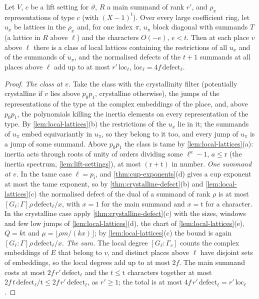 \begin{theorem}\label{thm:local-loss}
Let $V$, $c$ be a lift setting for $\vartheta$, $R$ a main summand of rank $r'$, and $\rho_x$ representations of type $c$ (with $(X-1)^t$). Over every large coefficient ring, let $u_x$ be lattices in the $\rho_x$ and, for one
index $\pi$, $u_\pi$ block diagonal with summands $T$ (a lattice in $R$ above $\ell$) and the characters $O(-e)$, $e<t$. Then at each place $v$ above $\ell$ there is a class of local lattices containing the restrictions of all
$u_x$ and of the summands of $u_\pi$, and the normalised defects of the $t+1$ summands at all places above $\ell$ add up to at most $r'\,\mathrm{loc}_\ell$, $\mathrm{loc}_\ell=4f\,\mathrm{defect}_\ell$.
\end{theorem}

\begin{proof}
\emph{The class at $v$.} Take the class with the crystallinity filter (potentially crystalline if $v$ lies above $p_0p_1$, crystalline otherwise), the jumps of the representations of the type at the complex embeddings of the place, and, above
$p_0p_1$, the polynomials killing the inertia elements on every representation of the type. By \cref{lem:local-lattices}(b) the restrictions of the $u_x$ lie in it; the summands of $u_\pi$ embed equivariantly in $u_\pi$, so they belong to it too,
and every jump of $u_\pi$ is a jump of some summand. Above $p_0p_1$ the class is tame by \cref{lem:local-lattices}(a): inertia acts through roots of unity of orders dividing some $\ell^a-1$, $a\le\mathrm r$ (the inertia spectrum,
\cref{lem:lift-settings}), at most $(\mathrm r+\mathrm t)$ in number. \emph{One summand at $v$.} In the tame case $\ell=p_i$, and \cref{thm:cup-exponents}(d) gives a cup exponent at most the tame exponent, so by \cref{thm:crystalline-defect}(b) and
\cref{lem:local-lattices}(c) the normalised defect of the dual of a summand of rank $\rho$ is at most $[G_\ell:\Gamma]\rho\,\mathrm{defect}_\ell/x$, with $x=1$ for the main summand and $x=\mathrm t$ for a character. In the crystalline case apply
\cref{thm:crystalline-defect}(c) with the sizes, windows and few low jumps of \cref{lem:local-lattices}(d), the chart of \cref{lem:local-lattices}(e), $Q=k\mathrm t$ and $\mu=\lfloor\rho m/(kx)\rfloor$; by \cref{lem:local-lattices}(c) the bound is again
$[G_\ell:\Gamma]\rho\,\mathrm{defect}_\ell/x$. \emph{The sum.} The local degree $[G_\ell:\Gamma_v]$ counts the complex embeddings of $E$ that belong to $v$, and distinct places above $\ell$ have disjoint sets of embeddings, so the local degrees add up to at
most $2f$. The main summand costs at most $2f\,r'\,\mathrm{defect}_\ell$ and the $t\le\mathrm t$ characters together at most $2f\,t\,\mathrm{defect}_\ell/\mathrm t\le2f\,r'\,\mathrm{defect}_\ell$, as $r'\ge1$; the total is at most $4f\,r'\,\mathrm{defect}_\ell=r'\,\mathrm{loc}_\ell$.
\end{proof}
